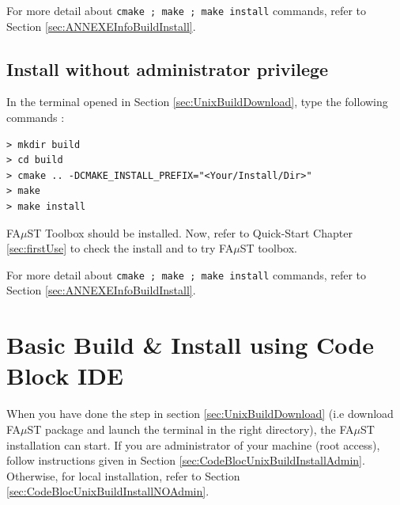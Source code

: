 For more detail about \texttt{cmake ; make ; make install} commands, refer to Section \ref{sec:ANNEXEInfoBuildInstall}.


\subsection{Install without administrator privilege}\label{sec:UnixBuildInstallNOAdmin}
In the terminal opened in Section \ref{sec:UnixBuildDownload}, type the following commands :
\lstset{style=customBash}
\begin{lstlisting}
> mkdir build
> cd build
> cmake .. -DCMAKE_INSTALL_PREFIX="<Your/Install/Dir>"
> make
> make install
\end{lstlisting}

FA$\mu$ST Toolbox should be installed. Now, refer to Quick-Start Chapter \ref{sec:firstUse} to check the install and to try FA$\mu$ST toolbox.

For more detail about \texttt{cmake ; make ; make install} commands, refer to Section \ref{sec:ANNEXEInfoBuildInstall}.


\section{Basic Build \& Install using Code Block IDE}\label{sec:UnixInstallCodeBlock}
When you have done the step in section  \ref{sec:UnixBuildDownload} (i.e download FA$\mu$ST package and launch the terminal in the right directory),  the FA$\mu$ST installation can start. If you are administrator of your machine (root access), follow instructions given in Section \ref{sec:CodeBlocUnixBuildInstallAdmin}. Otherwise, for local installation, refer to Section \ref{sec:CodeBlocUnixBuildInstallNOAdmin}. 

